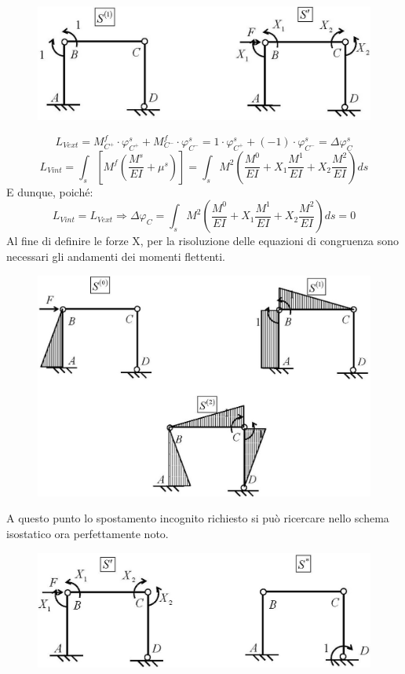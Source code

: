 \documentclass{article}
\begin{document}
\begin{adjustwidth}{2in}{}
\begin{figure}[H]
	\centering
	\includegraphics[width=0.4\linewidth]{"immagini/1.PARTE8_Pagina_71"}
\end{figure}

		\[L_{Vext} = M_{C^+}^f \cdot \varphi_{C^+}^s + M_{C^-}^f \cdot \varphi_{C^-}^s = 1 \cdot \varphi_{C^+}^s + (-1) \cdot \varphi_{C^-}^s = \Delta\varphi_C^s \]
		\[ 
		L_{Vint} = \int_{s}\left[ M^f\left( \dfrac{M^s}{EI} +\mu^s \right)\right] = \int_{s} M^2\left( \dfrac{M^0}{EI}  +X_1\dfrac{M^1}{EI}+X_2\dfrac{M^2}{EI} \right) ds 		
		\]	
		E dunque, poiché:
		\[L_{Vint} = L_{Vext} \Rightarrow \Delta\varphi_C = \int_{s} M^2\left( \dfrac{M^0}{EI}  +X_1\dfrac{M^1}{EI}+X_2\dfrac{M^2}{EI} \right) ds  = 0\]
		Al fine di definire le forze X, per la risoluzione delle equazioni di congruenza sono necessari gli
		andamenti dei momenti flettenti.
		
\begin{figure}[H]
	\centering
	\includegraphics[width=0.7\linewidth]{"immagini/1.PARTE8_Pagina_73"}
\end{figure}

		A questo punto lo spostamento incognito richiesto si può ricercare nello schema isostatico ora
		perfettamente noto.
		
\begin{figure}[H]
	\centering
	\includegraphics[width=0.4\linewidth]{"immagini/1.PARTE8_Pagina_74"}
\end{figure}


\end{adjustwidth}
\end{document}
